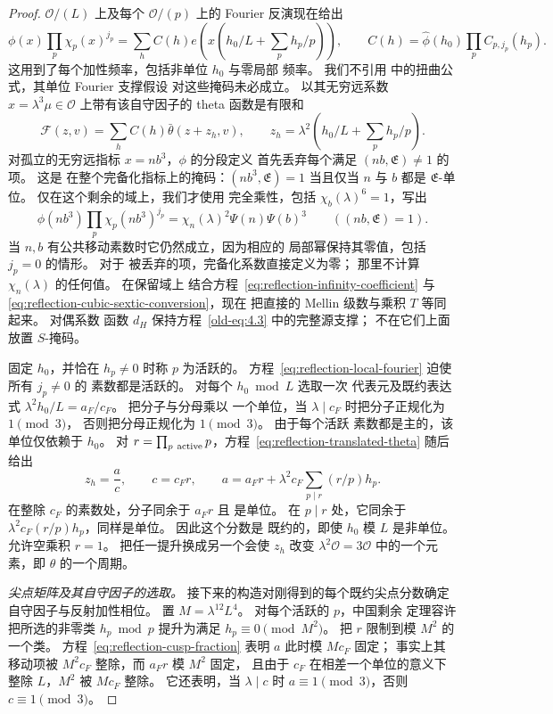 \begin{proof}
$\mathcal O/(L)$ 上及每个 $\mathcal O/(p)$ 上的
Fourier 反演现在给出
\[
 \phi(x)\prod_p\chi_p(x)^{j_p}
  =\sum_h C(h)e\!\left(x\left(h_0/L+\sum_p h_p/p\right)\right),
 \qquad C(h)=\widehat\phi(h_0)\prod_pC_{p,j_p}(h_p).
\]
这用到了每个加性频率，包括非单位 $h_0$ 与零局部
频率。 我们不引用
\cite[引理~5.2 与推论~5.1]{DR} 中的扭曲公式，其单位 Fourier 支撑假设
对这些掩码未必成立。 以其无穷远系数 $x=\lambda^3\mu\in\mathcal O$
上带有该自守因子的 theta 函数是有限和
\begin{equation}\label{eq:reflection-translated-theta}
 \mathcal F(z,v)=\sum_hC(h)\bar\theta(z+z_h,v),\qquad
 z_h=\lambda^2\left(h_0/L+\sum_p h_p/p\right).
\end{equation}
对孤立的无穷远指标 $x=nb^3$，$\phi$ 的分段定义
首先丢弃每个满足 $(nb,\mathfrak E)\ne1$ 的项。 这是
在整个完备化指标上的掩码：$(nb^3,\mathfrak E)=1$ 当且仅当 $n$
与 $b$ 都是 $\mathfrak E$-单位。 仅在这个剩余的域上，我们才使用
完全乘性，包括 $\chi_b(\lambda)^6=1$，写出
\[
 \phi(nb^3)\prod_p\chi_p(nb^3)^{j_p}
 =\chi_n(\lambda)^2\Psi(n)\Psi(b)^3
 \qquad((nb,\mathfrak E)=1).
\]
当 $n,b$ 有公共移动素数时它仍然成立，因为相应的
局部幂保持其零值，包括 $j_p=0$ 的情形。 对于
被丢弃的项，完备化系数直接定义为零；
那里不计算 $\chi_n(\lambda)$ 的任何值。 在保留域上
结合方程~\eqref{eq:reflection-infinity-coefficient} 与
\eqref{eq:reflection-cubic-sextic-conversion}，现在
把直接的 Mellin 级数与乘积 $T$ 等同起来。 对偶系数
函数 $d_H$ 保持方程~\eqref{old-eq:4.3} 中的完整源支撑；
不在它们上面放置 $S$-掩码。

固定 $h_0$，并恰在 $h_p\ne0$ 时称 $p$ 为活跃的。
方程~\eqref{eq:reflection-local-fourier} 迫使所有 $j_p\ne0$ 的
素数都是活跃的。 对每个 $h_0\bmod L$ 选取一次
代表元及既约表达式
$\lambda^2h_0/L=a_F/c_F$。 把分子与分母乘以
一个单位，当 $\lambda\mid c_F$ 时把分子正规化为 $1\pmod3$，
否则把分母正规化为 $1\pmod3$。 由于每个活跃
素数都是主的，该单位仅依赖于 $h_0$。
对 $r=\prod_{p\ {\rm active}}p$，方程~\eqref{eq:reflection-translated-theta}
随后给出
\begin{equation}\label{eq:reflection-cusp-fraction}
 z_h=\frac ac,\qquad c=c_Fr,\qquad
 a=a_Fr+\lambda^2c_F\sum_{p\mid r}(r/p)h_p.
\end{equation}
在整除 $c_F$ 的素数处，分子同余于 $a_Fr$ 且
是单位。 在 $p\mid r$ 处，它同余于
$\lambda^2c_F(r/p)h_p$，同样是单位。 因此这个分数是
既约的，即使 $h_0$ 模 $L$ 是非单位。 允许空乘积
$r=1$。 把任一提升换成另一个会使 $z_h$ 改变
$\lambda^2\mathcal O=3\mathcal O$ 中的一个元素，即 $\theta$ 的一个周期。

\emph{尖点矩阵及其自守因子的选取。}
接下来的构造对刚得到的每个既约尖点分数确定
自守因子与反射加性相位。
置 $M=\lambda^{12}L^4$。 对每个活跃的 $p$，中国剩余
定理容许把所选的非零类 $h_p\bmod p$ 提升为满足
$h_p\equiv0\pmod{M^2}$。 把 $r$ 限制到模 $M^2$ 的一个类。
方程~\eqref{eq:reflection-cusp-fraction} 表明 $a$ 此时模 $Mc_F$ 固定；
事实上其移动项被 $M^2c_F$ 整除，而 $a_Fr$ 模 $M^2$ 固定，
且由于 $c_F$ 在相差一个单位的意义下整除 $L$，$M^2$ 被 $Mc_F$ 整除。
它还表明，当 $\lambda\mid c$ 时 $a\equiv1\pmod3$，否则
$c\equiv1\pmod3$。


\end{proof}
